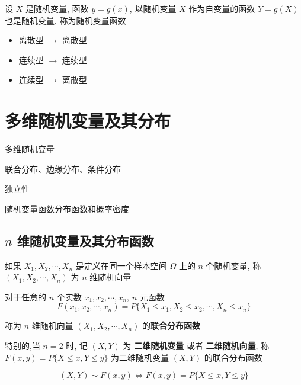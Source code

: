 \begin{definition}
	设 $X$ 是随机变量, 函数 $y = g(x)$, 以随机变量 $X$ 作为自变量的函数 $Y = g(X)$ 也是随机变量, 称为随机变量函数
	\begin{itemize}
		\item 离散型 $\to$ 离散型
		\item 连续型 $\to$ 连续型
		\item 连续型 $\to$ 离散型
	\end{itemize}
\end{definition}


\chapter{多维随机变量及其分布}
\begin{introduction}
	\item 多维随机变量
	\item 联合分布、边缘分布、条件分布
	\item 独立性
	\item 随机变量函数分布函数和概率密度
\end{introduction}
\section{$n$ 维随机变量及其分布函数}

\begin{definition}[$n$维随机变量]
	如果 $X_{1}, X_{2}, \cdots, X_{n}$ 是定义在同一个样本空间 $\Omega$ 上的 $n$ 个随机变量, 称 $(X_{1}, X_{2}, \cdots, X_{n})$ 为 $n$ 维随机向量
\end{definition}

\begin{definition}[$n$维随机变量分布函数]

	对于任意的 $n$ 个实数 $x_{1}, x_{2}, \cdots, x_{n}$, $n$ 元函数
	$$F(x_{1}, x_{2}, \cdots, x_{n}) = P\{X_{1}\leq x_{1},X_{2}\leq x_{2},\cdots,X_{n}\leq x_{n}\}$$
	
	称为 $n$ 维随机向量 $(X_{1},X_{2},\cdots,X_{n})$ 的\textbf{联合分布函数}
	
	特别的,当 $n = 2$ 时, 记 $(X,Y)$ 为 \textbf{二维随机变量} 或者 \textbf{二维随机向量}, 称 $F(x,y) = P\{X\leq x,Y\leq y\}$ 为二维随机变量 $(X,Y)$ 的联合分布函数 
	
	$$(X,Y)\sim F(x,y)\Leftrightarrow F(x,y)=P\{X\leq x,Y\leq y\}$$
\end{definition}

